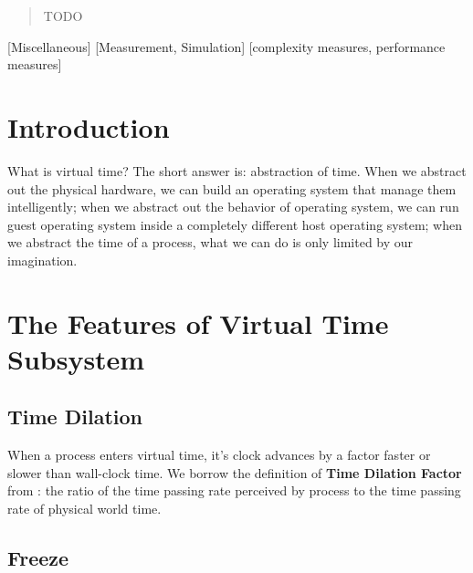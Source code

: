 \documentclass{acm_proc_article-sp}
\begin{document}
\date{30 July 1999}

\maketitle

\begin{abstract}
TODO
\end{abstract}

[Miscellaneous]
[Measurement, Simulation]
[complexity measures, performance measures]



\section{Introduction}
What is virtual time? The short answer is: abstraction of time. When we abstract out the physical hardware, we can build an operating system that manage them intelligently; when we abstract out the behavior of operating system, we can run guest operating system inside a completely different host operating system; when we abstract the time of a process, what we can do is only limited by our imagination.

\section{The Features of Virtual Time Subsystem}
\subsection{Time Dilation}
When a process enters virtual time, it's clock advances by a factor faster or slower than wall-clock time. We borrow the definition of \textbf{Time Dilation Factor} from \cite{toinfinitybeyond}: the ratio of the time passing rate perceived by process to the time passing rate of physical world time. 

\subsection{Freeze}
\end{document}
